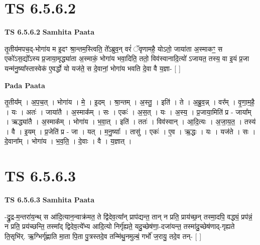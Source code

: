 \documentclass[17pt]{extarticle}
\begin{document}
\section*{ TS 6.5.6.2 }

\textbf{TS 6.5.6.2 } \newline
\textbf{Samhita Paata} \newline

तृ॒तीय॑मपच॒द्-भोगा॑य म इ॒दꣳ श्रा॒न्तम॒स्त्विति॒ ते᳚ऽब्रुव॒न् वरं॑ ॅवृणामहै॒ योऽतो॒ जाया॑ता अ॒स्माकꣳ॒॒ स एको॑ऽस॒द्यो᳚ऽस्य प्र॒जाया॒मृद्ध्या॑ता अ॒स्माकं॒ भोगा॑य भवा॒दिति॒ ततो॒ विव॑स्वानादि॒त्यो॑ ऽजायत॒ तस्य॒ वा इ॒यं प्र॒जा यन्म॑नु॒ष्या᳚स्तास्वेक॑ ए॒वर्द्धो यो यज॑ते॒ स दे॒वानां॒ भोगा॑य भवति दे॒वा वै य॒ज्ञा- [  ] \newline

\textbf{Pada Paata} \newline

तृ॒तीय᳚म् । अ॒प॒च॒त् । भोगा॑य । मे॒ । इ॒दम् । श्रा॒न्तम् । अ॒स्तु॒ । इति॑ । ते । अ॒ब्रु॒व॒न्न् । वर᳚म् । वृ॒णा॒म॒है॒ । यः । अतः॑ । जाया॑तै । अ॒स्माक᳚म् । सः । एकः॑ । अ॒स॒त् । यः । अ॒स्य॒ । प्र॒जाया॒मिति॑ प्र - जाया᳚म् । ऋद्ध्या॑तै । अ॒स्माक᳚म् । भोगा॑य । भ॒वा॒त् । इति॑ । ततः॑ । विव॑स्वान् । आ॒दि॒त्यः । अ॒जा॒य॒त॒ । तस्य॑ । वै । इ॒यम् । प्र॒जेति॑ प्र - जा । यत् । म॒नु॒ष्याः᳚ । तासु॑ । एकः॑ । ए॒व । ऋ॒द्धः । यः । यज॑ते । सः । दे॒वाना᳚म् । भोगा॑य । भ॒व॒ति॒ । दे॒वाः । वै । य॒ज्ञात् ।  \newline




\section*{ TS 6.5.6.3 }

\textbf{TS 6.5.6.3 } \newline
\textbf{Samhita Paata} \newline

-द्रु॒द्र-म॒न्तरा॑य॒न्थ् स आ॑दि॒त्यान॒न्वाक्र॑मत॒ ते द्वि॑देव॒त्या᳚न् प्राप॑द्यन्त॒ तान् न प्रति॒ प्राय॑च्छ॒न् तस्मा॒दपि॒ वद्ध्यं॒ प्रप॑न्नं॒ न प्रति॒ प्रय॑च्छन्ति॒ तस्मा᳚द् द्विदेव॒त्ये᳚भ्य आदि॒त्यो निर्गृ॑ह्यते॒ यदु॒च्छेष॑णा॒-दजा॑यन्त॒ तस्मा॑दु॒च्छेष॑णाद्-गृह्यते ति॒सृभि॑र्. ऋ॒ग्भिर्गृ॑ह्णाति मा॒ता पि॒ता पु॒त्रस्तदे॒व तन्मि॑थु॒नमुल्बं॒ गर्भो॑ ज॒रायु॒ तदे॒व तन्- [  ] \newline
\end{document}
